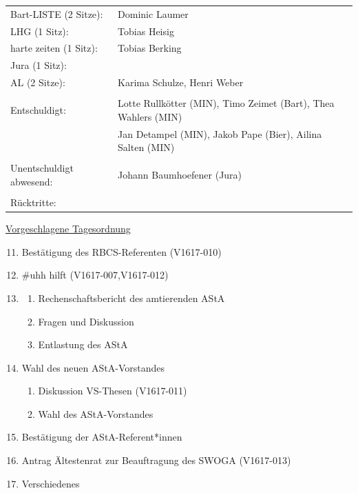 \documentclass[ngerman,headheight=70pt]{scrartcl}
\begin{document}
\begin{tabular}{ll}
             Bart-LISTE (2 Sitze): & Dominic Laumer \\
             LHG (1 Sitz): & Tobias Heisig \\
             harte zeiten (1 Sitz): & Tobias Berking \\
             Jura (1 Sitz): &  \\
             AL (2 Sitze): & Karima Schulze, Henri Weber \\
            & \\
        Entschuldigt: & Lotte Rullkötter (MIN), Timo Zeimet (Bart), Thea Wahlers (MIN)\\
                      & Jan Detampel (MIN), Jakob Pape (Bier), Ailina Salten (MIN)\\
                      & \\
        Unentschuldigt abwesend: &  Johann Baumhoefener (Jura)\\
                                &\\
        Rücktritte: & \\
    \end{tabular}
    \newpage
    \underline{Vorgeschlagene Tagesordnung}
    \begin{enumerate}[label={\textbf{Top \theenumi}},leftmargin=*]
        \setcounter{enumi}{10}
        \item Bestätigung des RBCS-Referenten (V1617-010)
        \item \#uhh hilft (V1617-007,V1617-012)
        \item
            \begin{enumerate}
                \item Rechenschaftsbericht des amtierenden AStA
                \item Fragen und Diskussion
                \item Entlastung des AStA
            \end{enumerate}
        \item Wahl des neuen AStA-Vorstandes
            \begin{enumerate}
                \item Diskussion VS-Thesen (V1617-011)
                \item Wahl des AStA-Vorstandes
            \end{enumerate}
        \item Bestätigung der AStA-Referent*innen
        \item Antrag Ältestenrat zur Beauftragung des SWOGA (V1617-013)
        \item Verschiedenes
    \end{enumerate}
\end{document}
